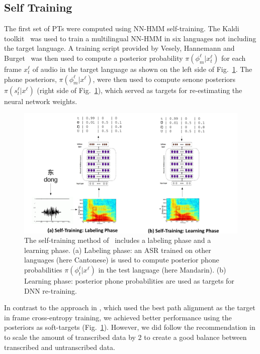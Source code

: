 \subsection{Self Training}
\label{sec:selftraining}

The first set of PTs were computed using NN-HMM self-training.  The
Kaldi toolkit~\cite{Kaldi2011} was used to train a multilingual NN-HMM
in six languages not including the target language.  A training script
provided by Vesely, Hannemann and Burget~\cite{vesely2013-semi} was
then used to compute a posterior probability
$\pi(\phi_m^\ell|x_t^\ell)$ for each frame $x_t^\ell$ of audio in the
target language as shown on the left side of Fig.~\ref{fig:hager}.
The phone posteriors, $\pi(\phi_m^\ell|x^\ell)$, were then used to
compute senone posteriors $\pi(s_t^\ell|x^\ell)$ (right side of
Fig.~\ref{fig:hager}), which served as targets for re-estimating the
neural network weights.
\begin{figure}
  \centerline{\includegraphics[width=5in]{../figs/fig_hager.png}}
  \caption{The self-training method of~\cite{vesely2013-semi} includes
    a labeling phase and a learning phase.  (a) Labeling phase: an ASR
    trained on other languages (here Cantonese) is used to compute
    posterior phone probabilities $\pi(\phi_t^\ell|x^\ell)$ in the
    test language (here Mandarin). (b) Learning phase: posterior phone
    probabilities are used as targets for DNN re-training.}
  \label{fig:hager}
\end{figure}

In contrast to the approach in \cite{vesely2013-semi}, which used the
best path alignment as the target in frame cross-entropy training, we
achieved better performance using the posteriors as soft-targets
(Fig.~\ref{fig:hager}). However, we did follow the recommendation in
\cite{vesely2013-semi} to scale the amount of transcribed data by 2 to 
create a good balance between transcribed and untranscribed data.

